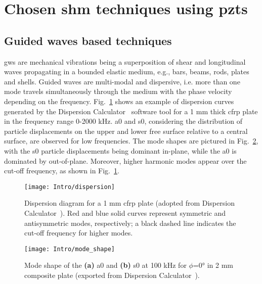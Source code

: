 \section{Chosen \acs{shm} techniques using \acsp{pzt}}
\label{sec:techniques}


\subsection{Guided waves based techniques}


\Acp{gw} are mechanical vibrations being a superposition of shear and longitudinal waves propagating in a bounded elastic medium, e.g., bars, beams, rods, plates and shells. 
Guided waves are multi-modal and dispersive, i.e. more than one mode travels simultaneously through the medium with the phase velocity depending on the frequency.
Fig.~\ref{fig:dispersion} shows an example of dispersion curves generated by the Dispersion Calculator~\cite{huber2021dispersion} software tool for a 1 \unit{\mm} thick \ac{cfrp} plate in the frequency range 0-2000 \unit{\kHz}.
\Ac{a0} and \ac{s0}, considering the distribution of particle displacements on the upper and lower free surface relative to a central surface, are observed for low frequencies.
The mode shapes are pictured in Fig.~\ref{fig:mode_shape}, with the \ac{s0} particle displacements being dominant in-plane, while the \ac{a0} is dominated by out-of-plane.
Moreover, higher harmonic modes appear over the cut-off frequency, as shown in Fig.~\ref{fig:dispersion}.
\begin{figure}
	\begin{center}
		\texttt{[image: Intro/dispersion]}
	\end{center}
	\caption{Dispersion diagram for a 1 \unit{\mm} \acf{cfrp} plate (adopted from Dispersion Calculator~\cite{huber2021dispersion}). Red and blue solid curves represent symmetric and antisymmetric modes, respectively; a black dashed line indicates the cut-off frequency for higher modes.}
	\label{fig:dispersion}
\end{figure}
\begin{figure}
	\begin{center}
		\texttt{[image: Intro/mode\_shape]}
	\end{center}
	\caption{Mode shape of the \textbf{(a)} \acf{a0} and \textbf{(b)} \acf{s0} at 100 \unit{\kHz} for \(\phi\)=\ang{0} in 2 \unit{\mm} composite plate (exported from Dispersion Calculator~\cite{huber2021dispersion}).}
	\label{fig:mode_shape}
\end{figure}

